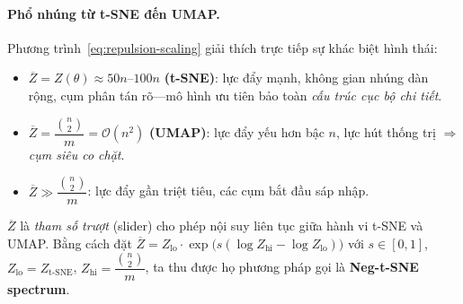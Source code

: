 \paragraph{Phổ nhúng từ t-SNE đến UMAP.}
Phương trình~\eqref{eq:repulsion-scaling} giải thích trực tiếp sự khác biệt hình thái:
\begin{itemize}
  \item $\overline{Z} = Z(\theta) \approx 50n$--$100n$ \textbf{(t-SNE)}: lực đẩy mạnh, không gian nhúng dàn rộng, cụm phân tán rõ---mô hình ưu tiên bảo toàn \emph{cấu trúc cục bộ chi tiết}.
  \item $\overline{Z} = \dfrac{\binom{n}{2}}{m} = \mathcal{O}(n^2)$ \textbf{(UMAP)}: lực đẩy yếu hơn bậc $n$, lực hút thống trị $\Rightarrow$ \emph{cụm siêu co chặt}.
  \item $\overline{Z} \gg \dfrac{\binom{n}{2}}{m}$: lực đẩy gần triệt tiêu, các cụm bắt đầu sáp nhập.
\end{itemize}

\begin{remark}
$\overline{Z}$ là \emph{tham số trượt} (slider) cho phép nội suy liên tục giữa hành vi t-SNE và UMAP. Bằng cách đặt $\overline{Z} = Z_{\text{lo}}\cdot\exp\!\bigl(s(\log Z_{\text{hi}} - \log Z_{\text{lo}})\bigr)$ với $s \in [0,1]$, $Z_{\text{lo}} = Z_{\text{t-SNE}}$, $Z_{\text{hi}} = \dfrac{\binom{n}{2}}{m}$, ta thu được họ phương pháp gọi là \textbf{Neg-t-SNE spectrum}.
\end{remark}


